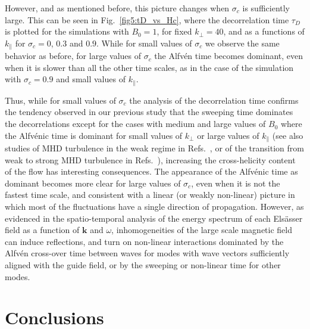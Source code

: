 \documentclass[aip,pop,reprint,amsmath,amssymb,floatfix]{revtex4-1}
\renewcommand{\vec}[1]{\mathbf{#1}}
\begin{document}
However, and as mentioned before, this picture changes when $\sigma_c$
is sufficiently large. This can be seen in Fig.~\ref{fig5:tD_vs_Hc},
where the decorrelation time $\tau_D$ is plotted for the simulations
with $B_0=1$, for fixed $k_\perp=40$, and as a functions of
$k_\parallel$ for $\sigma_c = 0$, $0.3$ and $0.9$. While for small
values of $\sigma_c$ we observe the same behavior as before, for large
values of $\sigma_c$ the Alfv\'en time becomes dominant, even when it
is slower than all the other time scales, as in the case of the
simulation with $\sigma_c=0.9$ and small values of $k_\parallel$.

Thus, while for small values of $\sigma_c$ the analysis of the
decorrelation time confirms the tendency observed in our previous
study \cite{lugones_2016_spatiotemporal} that the sweeping time
dominates the decorrelations except for the cases with medium and
large values of $B_0$ where the Alfv\'enic time is dominant for small
values of $k_{\perp}$ or large values of $k_{\parallel}$ (see also
studies of MHD turbulence in the weak regime in
Refs.~\cite{galtier_2000_weak,meyrand_weak_2015}, or of the transition
from weak to strong MHD turbulence in
Refs.~\cite{lugones_2016_spatiotemporal, meyrand_direct_2016}),
increasing the cross-helicity content of the flow has interesting
consequences. The appearance of the Alfv\'enic time as dominant
becomes more clear for large values of $\sigma_c$, even when it is not
the fastest time scale, and consistent with a linear (or weakly
non-linear) picture in which most of the fluctuations have a single
direction of propagation. However, as evidenced in the spatio-temporal
analysis of the energy spectrum of each Els\"asser field as a function
of $\vec{k}$ and $\omega$, inhomogeneities of the large scale magnetic
field can induce reflections, and turn on non-linear interactions
dominated by the Alfv\'en cross-over time between waves for modes with
wave vectors sufficiently aligned with the guide field, or by the
sweeping or non-linear time for other modes.

\section{Conclusions}\label{sec_Conclusions}
\end{document}
